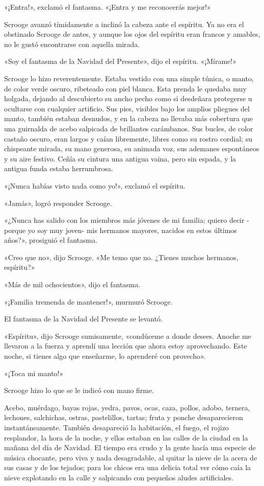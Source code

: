 \documentclass{novela}
\begin{document}
 «¡Entra!», exclamó el fantasma. «¡Entra y me reconocerás mejor!»

 Scrooge avanzó tímidamente a inclinó la cabeza ante el espíritu. Ya no era el obstinado Scrooge de antes, y aunque los ojos del espíritu eran francos y amables, no le gustó encontrarse con aquella mirada.

 «Soy el fantasma de la Navidad del Presente», dijo el espíritu. «¡Mírame!»

 Scrooge lo hizo reverentemente. Estaba vestido con una simple túnica, o manto, de color verde oscuro, ribeteado con piel blanca. Esta prenda le quedaba muy holgada, dejando al descubierto su ancho pecho como si desdeñara protegerse u ocultarse con cualquier artificio. Sus pies, visibles bajo los amplios pliegues del manto, también estaban desnudos, y en la cabeza no llevaba más cobertura que una guirnalda de acebo salpicada de brillantes carámbanos. Sus bucles, de color castaño oscuro, eran largos y caían libremente, libres como su rostro cordial; su chispeante mirada, su mano generosa, su animada voz, sus ademanes espontáneos y su aire festivo. Ceñía su cintura una antigua vaina, pero sin espada, y la antigua funda estaba herrumbrosa.

 «¡Nunca habías visto nada como yo!», exclamó el espíritu.

 «Jamás», logró responder Scrooge.

 «¿Nunca has salido con los miembros más jóvenes de mi familia; quiero decir -porque yo soy muy joven- mis hermanos mayores, nacidos en estos últimos años?», prosiguió el fantasma.

 «Creo que no», dijo Scrooge. «Me temo que no. ¿Tienes muchos hermanos, espíritu?»

 «Más de mil ochocientos», dijo el fantasma.

 «¡Familia tremenda de mantener!», murmuró Scrooge.

 El fantasma de la Navidad del Presente se levantó.

 «Espíritu», dijo Scrooge sumisamente, «condúceme a donde desees. Anoche me llevaron a la fuerza y aprendí una lección que ahora estoy aprovechando. Este noche, si tienes algo que enseñarme, lo aprenderé con provecho».

 «¡Toca mi manto!»

 Scrooge hizo lo que se le indicó con mano firme.

 Acebo, muérdago, bayas rojas, yedra, pavos, ocas, caza, pollos, adobo, ternera, lechones, salchichas, ostras, pastelillos, tartas; fruta y ponche desaparecieron instantáneamente. También desapareció la habitación, el fuego, el rojizo resplandor, la hora de la noche, y ellos estaban en las calles de la ciudad en la mañana del día de Navidad. El tiempo era crudo y la gente hacía una especie de música chocante, pero viva y nada desagradable, al quitar la nieve de la acera de sus casas y de los tejados; para los chicos era una delicia total ver cómo caía la nieve explotando en la calle y salpicando con pequeños aludes artificiales.
\end{document}
